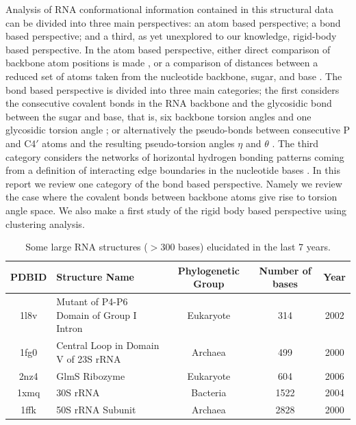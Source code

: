 \noindent Analysis of RNA conformational information contained in this
structural data can  be divided into three main  perspectives: an atom
based perspective; a bond  based perspective; and a third, as yet unexplored
to our knowledge,  rigid-body based perspective.   In the atom based
perspective,  either direct  comparison of  backbone atom  positions is
made \cite{reijmers2001}, or a comparison of distances between a reduced
set  of atoms  taken from  the  nucleotide backbone,  sugar, and  base
\cite{sykes2005}. The bond based  perspective is divided into three main
categories; the first considers the consecutive covalent bonds in the RNA
backbone and the glycosidic bond between the sugar and base,  that is, six
backbone   torsion   angles   and   one   glycosidic   torsion   angle
\cite{reijmers2001,  murray2003, hershkovitz2003, schneider2004,
hershkovitz2006};
or alternatively the pseudo-bonds between consecutive
P and  C4$\prime$ atoms  and the resulting  pseudo-torsion angles  $\eta$ and
$\theta$  \cite{olson1_1972,  duarte1998,  duarte2003, wadley2007}.  The
third category considers the  networks of horizontal hydrogen bonding
patterns coming  from a definition  of interacting edge  boundaries in
the nucleotide bases  \cite{westhof2000, leontis2002, leontis2006}. In
this report we review one category of the bond based
perspective. Namely we review the  case where the covalent bonds
between backbone atoms give rise to torsion angle space. We also make
a first study of the rigid body based perspective using clustering analysis.
\begin{table}[htbp]
\begin{center}
{\small
\begin{tabular}{c|p{5cm}|c|c|c}
\hline
\bf{PDBID} & \bf{Structure Name} & \bf{Phylogenetic Group} & \bf{Number of bases} & \bf{Year} \\ \hline
1l8v & Mutant of P4-P6 Domain of Group I Intron & Eukaryote & 314 & 2002 \\ \hline
1fg0 & Central Loop in Domain V of 23S rRNA & Archaea & 499 & 2000 \\ \hline
2nz4 & GlmS Ribozyme & Eukaryote & 604 & 2006 \\ \hline
1xmq & 30S rRNA & Bacteria & 1522 & 2004 \\ \hline
1ffk & 50S rRNA Subunit & Archaea & 2828 & 2000 \\ \hline
\end{tabular}
}
\caption{Some large RNA structures ($>$300 bases) elucidated in the last 7 years.}
\end{center}
\end{table}

